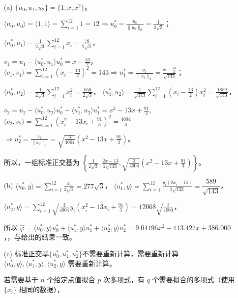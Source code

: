 \documentclass[lang=cn,a4paper,newtx,bibend=bibtex]{elegantpaper}
\newcommand{\indot}[2]{\langle {#1}, {#2} \rangle}
\begin{document}
\begin{solution}~~

\begin{enumerate}
\item[(a)]
$\{u_0, u_1, u_2\} = \{1, x, x^2\}$。

$\indot{u_0}{u_0} = \indot{1}{1} = \sum\limits_{i = 1}^{12} 1 = 12 \Rightarrow u_0^* = \frac{u_0}{\| u_0 \|_2} = \frac1{2\sqrt{3}}$；

$\indot{u_0^*}{u_1} = \frac{1}{2\sqrt{3}} \sum\limits_{i = 1}^{12} x_i = \frac{78}{2\sqrt{3}}$，

$v_1 = u_1 - \indot{u_0^*}{u_1} u_0^* = x - \frac{13}2$，$\indot{v_1}{v_1} = \sum\limits_{i = 1}^{12} (x_i - \frac{13}2)^2 = 143 \Rightarrow u_1^* = \frac{v_1}{\| u_1\|_2} = \frac{x - \frac{13}2}{\sqrt{143}}$；

$\indot{u_0^*}{u_2} = \frac1{2\sqrt{3}}\sum\limits_{i = 1}^{12} x_i^2 = \frac{650}{2\sqrt{3}}$，
$\indot{u_1^*}{u_2} = \frac{1}{\sqrt{143}}\sum\limits_{i = 1}^{12} (x_i - \frac{13}2)x_i^2 = \frac{1859}{\sqrt{143}}$，

$v_2 = u_2 - \indot{u_0^*}{u_2}u_0^* - \indot{u_1^*}{u_2}u_1^* = x^2 - 13x + \frac{91}3$,
$\indot{v_2}{v_2} = \sum\limits_{i = 1}^{12}(x_i^2 - 13x_i + \frac{91}3)^2 = \frac{4004}{3}$

$\Rightarrow u_2^* = \frac{v_2}{\| u_2\|_2} =\sqrt{\frac{3}{4004}}(x^2 - 13x + \frac{91}{3})$。


所以，一组标准正交基为 $\left\{\frac{1}{2\sqrt3}, \frac{2x - 13}{2 \sqrt{143}}, \sqrt{\frac3{4004}}(x^2 - 13x + \frac{91}3)\right\}$。


\item[(b)]
$\indot{u_0^*}{y}=\sum\limits_{i=1}^{12}\frac{y_i}{2\sqrt 3}=277\sqrt 3$，
$\indot{u_1^*}{y}=\sum\limits_{i=1}^{12}\frac{y_i(2x_i-13)}{2\sqrt {143}}=\dfrac{589}{\sqrt {143}}$，

$\indot{u_2^*}{y}=\sum\limits_{i=1}^{12}{\sqrt{\frac{3}{4004}}}{y_i(x_i^2-13x_i+\frac{91}{3})}={12068}{\sqrt{\frac{3}{4004}}}$，

所以 $\hat{\varphi} = \indot{u_0^*}{y}u_0^* + \indot{u_1^*}{y}u_1^* + \indot{u_2^*}{y}u_2^* = 9.04196 x^2 - 113.427 x + 386.000$，，与给出的结果一致。

\item[(c)] 
标准正交基$\{u_0^*, u_1^*, u_2^*\}$不需要重新计算，需要重新计算 $\indot{u_0^*}{y}, \indot{u_1^*}{y}, \indot{u_2^*}{y}$ 需要重新计算。

若需要基于 $n$ 个给定点值拟合 $p$ 次多项式，有 $q$ 个需要拟合的多项式（使用 $\{x_i\}$ 相同的数据），


\end{enumerate}
\end{solution}
\end{document}
